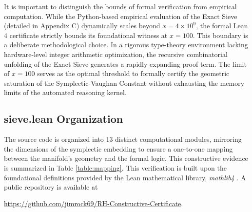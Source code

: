\documentclass[sn-mathphys-num, pdflatex, referee]{sn-jnl}
\begin{document}
It is important to distinguish the bounds of formal verification from empirical computation. While the Python-based empirical evaluation of the Exact Sieve (detailed in Appendix C) dynamically scales beyond $x = 4 \times 10^9$, the formal Lean 4 certificate strictly bounds its foundational witness at $x=100$. This boundary is a deliberate methodological choice. In a rigorous type-theory environment lacking hardware-level integer arithmetic optimization, the recursive combinatorial unfolding of the Exact Sieve generates a rapidly expanding proof term. The limit of $x=100$ serves as the optimal threshold to formally certify the geometric saturation of the Symplectic-Vaughan Constant without exhausting the memory limits of the automated reasoning kernel.
\subsection{sieve.lean Organization}
The source code is organized into 13 distinct computational modules, mirroring the dimensions of the symplectic embedding to ensure a one-to-one mapping between the manifold's geometry and the formal logic. This constructive evidence is summarized in Table \ref{table:mapping}. This verification is built upon the foundational definitions provided by the Lean mathematical library, \textit{mathlib4} \cite{mathlib2020}. A public repository is available at 

\noindent \url{https://github.com/jimrock69/RH-Constructive-Certificate}. 
\end{document}
